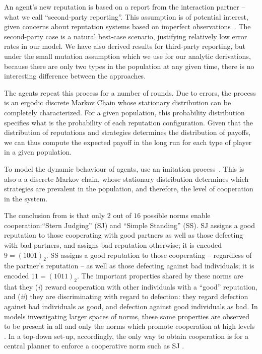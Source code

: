 \documentclass[sigconf]{aamas}  %
\begin{document}
 An agent's new reputation is based on a report from the interaction partner -- what we call ``second-party reporting''. This assumption is of potential interest, given concerns about reputation systems based on imperfect observations~\cite{haynes2017engineering}. The second-party case is a natural best-case scenario, justifying relatively low error rates in our model. We have also derived results for third-party reporting, but under the small mutation assumption which we use for our analytic derivations, because there are only two types in the population at any given time, there is no interesting difference between the approaches.
 
 The agents repeat this process for a number of rounds. Due to errors, the process is an ergodic discrete Markov Chain whose stationary distribution can be completely characterized. For a given population, this probability distribution specifies what is the probability of each reputation configuration. Given that the distribution of reputations and strategies determines the distribution of payoffs, we can thus compute the expected payoff in the long run for each type of player in a given population.
 
 To model the dynamic behaviour of agents, \cite{Santos2016} use an imitation process~\cite{traulsen:bookchapter:2009}. This is also a a discrete Markov chain, whose stationary distribution determines which strategies are prevalent in the population, and therefore, the level of cooperation in the system.
 
 The conclusion from \cite{Santos2016} is that only $2$ out of $16$ possible norms enable cooperation:``Stern Judging'' (SJ) and ``Simple Standing'' (SS). SJ assigns a good reputation to those cooperating with good partners as well as those defecting with bad partners, and assigns bad reputation otherwise; it is encoded $9=(1001)_{2}$. SS assigns a good reputation to those cooperating -- regardless of the partner's reputation -- as well as those defecting against bad individuals; it is encoded $11=(1011)_{2}$. The important properties shared by these norms are that they (\emph{i}) reward cooperation with other individuals with a “good” reputation, and (\emph{ii}) they are discriminating with regard to defection: they regard defection against bad individuals as good, and defection against good individuals as bad. In models investigating larger spaces of norms, these same properties are observed to be present in all and only the norms which promote cooperation at high levels \cite{ohtsuki:JTB:2006a}. In a top-down set-up, accordingly, the only way to obtain cooperation is for a central planner to enforce a cooperative norm such as SJ \cite{Santos2016}.
\end{document}
